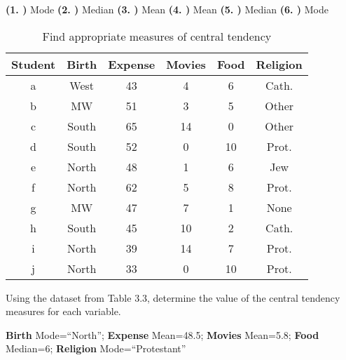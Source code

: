 \documentclass[11pt]{book}\usepackage[]{graphicx}\usepackage[]{color}
\begin{document}
\begin{exercises}
\begin{solution}
  {\bf{(1. )}} Mode  {\bf{(2. )}} Median  {\bf{(3. )}} Mean  {\bf{(4. )}} Mean  {\bf{(5. )}} Median  {\bf{(6. )}} Mode

  \end{solution}

  \begin{exercise} %

\begin{table}[htbp]
   \centering
   \caption{Find appropriate measures of central tendency}
   {\tiny{
   \begin{tabular}{@{} cccccc  @{}} \hline %
   Student & Birth  & Expense & Movies & Food & Religion \\ \hline
   a & West  & 43 & 4 & 6 & Cath. \\
   b & MW  & 51 & 3 & 5 & Other \\
   c & South  & 65 & 14 & 0 & Other \\
   d & South  & 52 & 0 & 10 & Prot. \\
   e & North  & 48 & 1 & 6 & Jew \\
   f & North  & 62 & 5 & 8 & Prot. \\
   g & MW  & 47 & 7 & 1 & None \\
   h & South  & 45 & 10 & 2 & Cath. \\
   i & North  & 39 & 14 & 7 & Prot. \\
   j & North  & 33 & 0 & 10 & Prot. \\ \hline
   \end{tabular}
   }}
   \label{tab:t3_3a}
\end{table}

  Using the dataset from Table 3.3, determine the value of the central tendency measures for each variable.

  \end{exercise}
   \begin{solution}  %

     {\bf{Birth}} Mode=``North'';   {\bf{Expense}} Mean=48.5; {\bf{Movies}} Mean=5.8; {\bf{Food}} Median=6;  {\bf{Religion}} Mode=``Protestant''

   \end{solution}

  \begin{exercise} %


\end{exercise}
\end{exercises}
\end{document}
